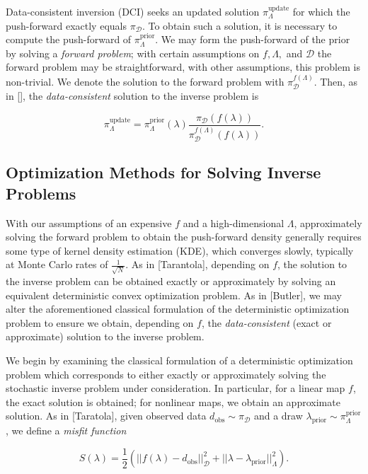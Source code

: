 \documentclass{amsart}
\begin{document}
Data-consistent inversion (DCI) seeks an updated solution $\pi_\Lambda^\text{update}$ for which the push-forward exactly equals $\pi_\mathcal{D}$. To obtain such a solution, it is necessary to compute the push-forward of $\pi_\Lambda^\text{prior}$. We may form the push-forward of the prior by solving a \textit{forward problem}; with certain assumptions on $f, \Lambda,$ and $\mathcal{D}$ the forward problem may be straightforward, with other assumptions, this problem is non-trivial. We denote the solution to the forward problem with $\pi_\mathcal{D}^{f(\Lambda)}$. Then, as in [], the \textit{data-consistent} solution to the inverse problem is

\begin{equation} \label{eq:1}
\pi_\Lambda^\text{update}=\pi_\Lambda^\text{prior}(\lambda)\frac{\pi_\mathcal{D}(f(\lambda))}{\pi_\mathcal{D}^{f(\Lambda)}(f(\lambda))}.
\end{equation}

\subsection{Optimization Methods for Solving Inverse Problems}

With our assumptions of an expensive $f$ and a high-dimensional $\Lambda$, approximately solving the forward problem to obtain the push-forward density generally requires some type of kernel density estimation (KDE), which converges slowly, typically at Monte Carlo rates of $ \frac{1}{\sqrt{N}}$. As in [Tarantola], depending on $f$, the solution to the inverse problem can be obtained exactly or approximately by solving an equivalent deterministic convex optimization problem. As in [Butler], we may alter the aforementioned classical formulation of the deterministic optimization problem to ensure we obtain, depending on $f$, the \textit{data-consistent} (exact or approximate) solution to the inverse problem.

We begin by examining the classical formulation of a deterministic optimization problem which corresponds to either exactly or approximately solving the stochastic inverse problem under consideration. In particular, for a linear map $f$, the exact solution is obtained; for nonlinear maps, we obtain an approximate solution. As in [Taratola], given observed data $d_{\text{obs}} \sim \pi_\mathcal{D}$ and a draw $\lambda_\text{prior}\sim \pi_\Lambda^\text{prior}$, we define a \textit{misfit function}

\begin{equation} \label{eq:2}
S(\lambda)=\frac{1}{2}\left(||f(\lambda)-d_{\text{obs}}||_\mathcal{D}^2+||\lambda-\lambda_{\text{prior}}||_\Lambda^2\right).
\end{equation}
\end{document}
